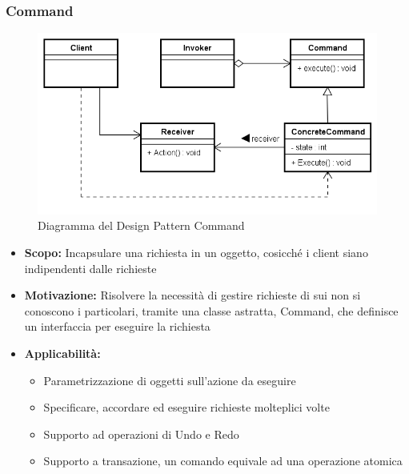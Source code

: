 \documentclass[a4paper]{article}
\begin{document}
	\subsubsection{Command}
				\begin{figure}[H]
					\centering
					\includegraphics[scale=0.65]{immagini/ST/schemaCommand.png}
					\caption{Diagramma del Design Pattern Command}
				\end{figure}
            \begin{itemize}
				\item \textbf{Scopo:} Incapsulare una richiesta in un oggetto, cosicché i client siano indipendenti dalle richieste 
                \item \textbf{Motivazione:} Risolvere la necessità di gestire richieste di sui non si conoscono i particolari, tramite una classe astratta, Command, che definisce un interfaccia per eseguire la richiesta
                \item \textbf{Applicabilità:}
					\begin{itemize}
						\item Parametrizzazione di oggetti sull'azione da eseguire
						\item Specificare, accordare ed eseguire richieste molteplici volte
						\item Supporto ad operazioni di Undo e Redo
						\item Supporto a transazione, un comando equivale ad una operazione atomica
					\end{itemize}		
			\end{itemize}
				
\end{document}
